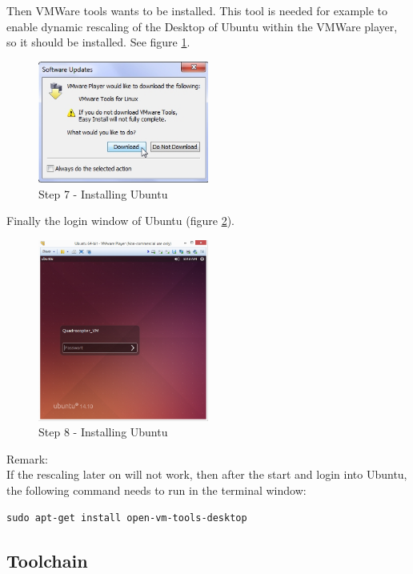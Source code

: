 Then VMWare tools wants to be installed. This tool is needed for example to enable dynamic rescaling of the Desktop of Ubuntu within the VMWare player, so it should be installed. See figure \ref{fig:Ub7}.

\begin{figure}[H]
	\centering\includegraphics[width=0.5\textwidth]{fig/Ub7.jpg}
	\caption{Step 7 - Installing Ubuntu}
	\label{fig:Ub7}
\end{figure}

Finally the login window of Ubuntu (figure \ref{fig:Ub9}).

\begin{figure}[H]
	\centering\includegraphics[width=0.5\textwidth]{fig/Ub9.jpg}
	\caption{Step 8 - Installing Ubuntu}
	\label{fig:Ub9}
\end{figure}

Remark:\\
If the rescaling later on will not work, then after the start and login into Ubuntu, the following command needs to run in the terminal window:
\begin{lstlisting}
sudo apt-get install open-vm-tools-desktop
\end{lstlisting}


\subsection{Toolchain}
\label{subsec:sec-TC}

